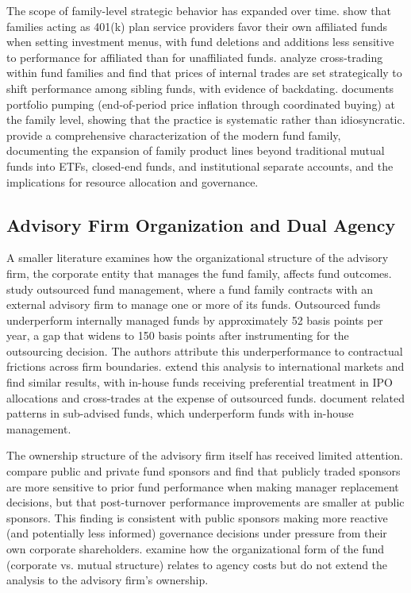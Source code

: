 \documentclass[hidelinks,12pt]{article}
\begin{document}
The scope of family-level strategic behavior has expanded over time. \citet{pool2016menu} show that families acting as 401(k) plan service providers favor their own affiliated funds when setting investment menus, with fund deletions and additions less sensitive to performance for affiliated than for unaffiliated funds. \citet{eisele2019cross} analyze cross-trading within fund families and find that prices of internal trades are set strategically to shift performance among sibling funds, with evidence of backdating. \citet{wang2024pumping} documents portfolio pumping (end-of-period price inflation through coordinated buying) at the family level, showing that the practice is systematic rather than idiosyncratic. \citet{dannhauser2023modern} provide a comprehensive characterization of the modern fund family, documenting the expansion of family product lines beyond traditional mutual funds into ETFs, closed-end funds, and institutional separate accounts, and the implications for resource allocation and governance.

\subsection{Advisory Firm Organization and Dual Agency}

A smaller literature examines how the organizational structure of the advisory firm, the corporate entity that manages the fund family, affects fund outcomes. \citet{chen2013outsourcing} study outsourced fund management, where a fund family contracts with an external advisory firm to manage one or more of its funds. Outsourced funds underperform internally managed funds by approximately 52 basis points per year, a gap that widens to 150 basis points after instrumenting for the outsourcing decision. The authors attribute this underperformance to contractual frictions across firm boundaries. \citet{chuprinin2015outsourcing} extend this analysis to international markets and find similar results, with in-house funds receiving preferential treatment in IPO allocations and cross-trades at the expense of outsourced funds. \citet{moreno2018subadvising} document related patterns in sub-advised funds, which underperform funds with in-house management.

The ownership structure of the advisory firm itself has received limited attention. \citet{adams2012public} compare public and private fund sponsors and find that publicly traded sponsors are more sensitive to prior fund performance when making manager replacement decisions, but that post-turnover performance improvements are smaller at public sponsors. This finding is consistent with public sponsors making more reactive (and potentially less informed) governance decisions under pressure from their own corporate shareholders. \citet{ferris2009agency} examine how the organizational form of the fund (corporate vs. mutual structure) relates to agency costs but do not extend the analysis to the advisory firm's ownership.
\end{document}
